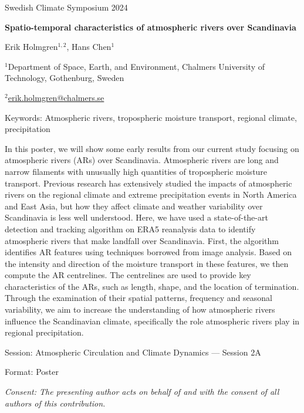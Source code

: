 \documentclass[11pt]{article}
\begin{document}
\begin{flushright}
	\small{Swedish Climate Symposium 2024}
\end{flushright}

\begin{center}
	\bf{Spatio-temporal characteristics of atmospheric rivers over Scandinavia}
\end{center}
Erik Holmgren$^{1,2}$, Hans Chen$^1$

\bigskip
\noindent
$^1$Department of Space, Earth, and Environment, Chalmers University of Technology, Gothenburg, Sweden

\noindent
$^2$\href{mailto:erik.holmgren@chalmers.se}{erik.holmgren@chalmers.se}

\bigskip
\noindent
Keywords: Atmospheric rivers, tropospheric moisture transport, regional climate, precipitation

\bigskip
\noindent
In this poster, we will show some early results from our current study focusing on atmospheric rivers (ARs) over Scandinavia.
Atmospheric rivers are long and narrow filaments with unusually high quantities of tropospheric moisture transport.
Previous research has extensively studied the impacts of atmospheric rivers on the regional climate and extreme precipitation events in North America and East Asia, but how they affect climate and weather variability over Scandinavia is less well understood.
Here, we have used a state-of-the-art detection and tracking algorithm on ERA5 reanalysis data to identify atmospheric rivers that make landfall over Scandinavia.
First, the algorithm identifies AR features using techniques borrowed from image analysis.
Based on the intensity and direction of the moisture transport in these features, we then compute the AR centrelines.
The centrelines are used to provide key characteristics of the ARs, such as length, shape, and the location of termination.
Through the examination of their spatial patterns, frequency and seasonal variability, we aim to increase the understanding of how atmospheric rivers influence the Scandinavian climate, specifically the role atmospheric rivers play in regional precipitation.


\bigskip
\noindent
Session: Atmospheric Circulation and Climate Dynamics — Session 2A

\noindent
Format: Poster

\bigskip
\noindent
\emph{Consent: The presenting author acts on behalf of and with the consent of all authors of this contribution.}
\end{document}
